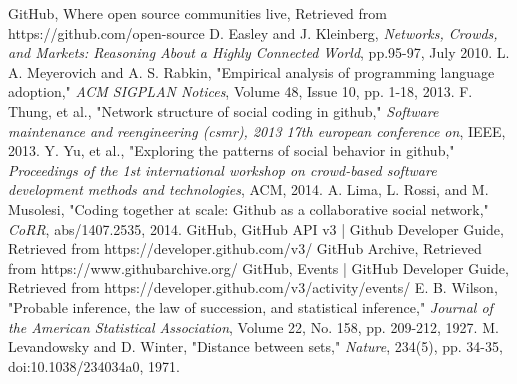 \documentclass[10pt, a4paper, titlepage]{article}
\begin{document}
\begin{thebibliography}{9}
 GitHub, Where open source communities live, Retrieved from https://github.com/open-source 
 D. Easley and J. Kleinberg, \emph{Networks, Crowds, and Markets: Reasoning About a Highly Connected World}, pp.95-97, July 2010.
 L. A. Meyerovich and A. S. Rabkin, "Empirical analysis of programming language adoption," \emph{ACM SIGPLAN Notices}, Volume 48, Issue 10, pp. 1-18, 2013.
 F. Thung, et al., "Network structure of social coding in github," \emph{Software maintenance and reengineering (csmr), 2013 17th european conference on}, IEEE, 2013.
 Y. Yu, et al., "Exploring the patterns of social behavior in github," \emph{Proceedings of the 1st international workshop on crowd-based software development methods and technologies}, ACM, 2014.
 A. Lima, L. Rossi, and M. Musolesi, "Coding together at scale: Github as a collaborative social network," \emph{CoRR}, abs/1407.2535, 2014.
 GitHub, GitHub API v3 | Github Developer Guide, Retrieved from https://developer.github.com/v3/
 GitHub Archive, Retrieved from https://www.githubarchive.org/
 GitHub, Events | GitHub Developer Guide, Retrieved from https://developer.github.com/v3/activity/events/
 E. B. Wilson, "Probable inference, the law of succession, and statistical inference," \emph{Journal of the American Statistical Association}, Volume 22, No. 158, pp. 209-212, 1927.
 M. Levandowsky and D. Winter, "Distance between sets," \emph{Nature}, 234(5), pp. 34-35, doi:10.1038/234034a0, 1971.

\end{thebibliography}
\end{document}
